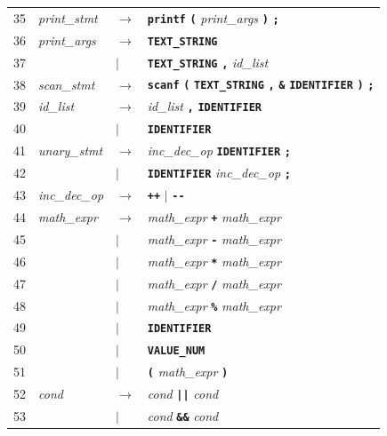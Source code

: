 \documentclass[letterpaper,12pt,oneside]{article}
\begin{document}
\begin{longtable}{c p{2.8cm} p{0.5cm} p{9cm}}
35 & \textit{print\_stmt} & $\rightarrow$ & \textbf{\texttt{printf}} \; \textbf{\texttt{(}} \; \textit{print\_args} \; \textbf{\texttt{)}} \; \textbf{\texttt{;}} \\[4pt]
36 & \textit{print\_args} & $\rightarrow$ & \textbf{\texttt{TEXT\_STRING}} \\
37 & & $|$ & \textbf{\texttt{TEXT\_STRING}} \; \textbf{\texttt{,}} \; \textit{id\_list} \\[4pt]
38 & \textit{scan\_stmt} & $\rightarrow$ & \textbf{\texttt{scanf}} \; \textbf{\texttt{(}} \; \textbf{\texttt{TEXT\_STRING}} \; \textbf{\texttt{,}} \; \textbf{\texttt{\&}} \; \textbf{\texttt{IDENTIFIER}} \; \textbf{\texttt{)}} \; \textbf{\texttt{;}} \\[4pt]
39 & \textit{id\_list} & $\rightarrow$ & \textit{id\_list} \; \textbf{\texttt{,}} \; \textbf{\texttt{IDENTIFIER}} \\
40 & & $|$ & \textbf{\texttt{IDENTIFIER}} \\[4pt]
41 & \textit{unary\_stmt} & $\rightarrow$ & \textit{inc\_dec\_op} \; \textbf{\texttt{IDENTIFIER}} \; \textbf{\texttt{;}} \\
42 & & $|$ & \textbf{\texttt{IDENTIFIER}} \; \textit{inc\_dec\_op} \; \textbf{\texttt{;}} \\[4pt]
43 & \textit{inc\_dec\_op} & $\rightarrow$ & \textbf{\texttt{++}} \; $|$ \; \textbf{\texttt{-{}-}} \\[4pt]
44 & \textit{math\_expr} & $\rightarrow$ & \textit{math\_expr} \; \textbf{\texttt{+}} \; \textit{math\_expr} \\
45 & & $|$ & \textit{math\_expr} \; \textbf{\texttt{-}} \; \textit{math\_expr} \\
46 & & $|$ & \textit{math\_expr} \; \textbf{\texttt{*}} \; \textit{math\_expr} \\
47 & & $|$ & \textit{math\_expr} \; \textbf{\texttt{/}} \; \textit{math\_expr} \\
48 & & $|$ & \textit{math\_expr} \; \textbf{\texttt{\%}} \; \textit{math\_expr} \\
49 & & $|$ & \textbf{\texttt{IDENTIFIER}} \\
50 & & $|$ & \textbf{\texttt{VALUE\_NUM}} \\
51 & & $|$ & \textbf{\texttt{(}} \; \textit{math\_expr} \; \textbf{\texttt{)}} \\[4pt]
52 & \textit{cond} & $\rightarrow$ & \textit{cond} \; \textbf{\texttt{||}} \; \textit{cond} \\
53 & & $|$ & \textit{cond} \; \textbf{\texttt{\&\&}} \; \textit{cond} \\

\end{longtable}
\end{document}
